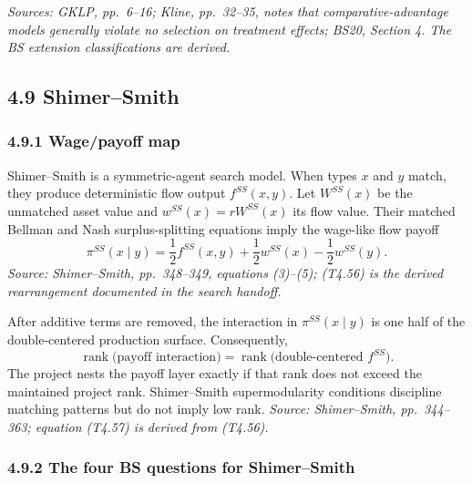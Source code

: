 \documentclass[11pt]{article}
\begin{document}
\textit{Sources: GKLP, pp.\ 6--16; Kline, pp.\ 32--35, notes that
comparative-advantage models generally violate no selection on treatment
effects; BS20, Section 4.  The BS extension classifications are derived.}

\subsection{4.9 Shimer--Smith}

\subsubsection{4.9.1 Wage/payoff map}

Shimer--Smith is a symmetric-agent search model.  When types \(x\) and \(y\)
match, they produce deterministic flow output \(f^{SS}(x,y)\).  Let
\(W^{SS}(x)\) be the unmatched asset value and
\(w^{SS}(x)=rW^{SS}(x)\) its flow value.  Their matched Bellman and Nash
surplus-splitting equations imply the wage-like flow payoff
\[
\pi^{SS}(x\mid y)
=
\frac12f^{SS}(x,y)
+\frac12w^{SS}(x)
-\frac12w^{SS}(y).
\tag{T4.56}
\]
\textit{Source: Shimer--Smith, pp.\ 348--349, equations (3)--(5);
(T4.56) is the derived rearrangement documented in the search handoff.}

After additive terms are removed, the interaction in
\(\pi^{SS}(x\mid y)\) is one half of the double-centered production surface.
Consequently,
\[
\operatorname{rank}
\bigl(
\text{payoff interaction}
\bigr)
=
\operatorname{rank}
\bigl(
\text{double-centered }f^{SS}
\bigr).
\tag{T4.57}
\]
The project nests the payoff layer exactly if that rank does not exceed the
maintained project rank.  Shimer--Smith supermodularity conditions discipline
matching patterns but do not imply low rank.
\textit{Source: Shimer--Smith, pp.\ 344--363; equation (T4.57) is derived
from (T4.56).}

\subsubsection{4.9.2 The four BS questions for Shimer--Smith}
\end{document}
